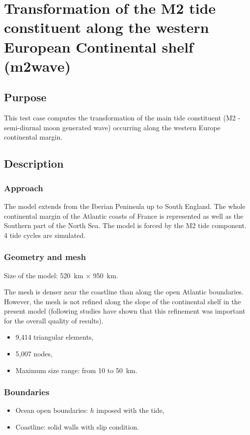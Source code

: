 \chapter{Transformation of the M2 tide constituent along the western European Continental shelf (m2wave)}

\section{Purpose}
This test case computes the transformation of the main tide constituent
(M2 - semi-diurnal moon generated wave) occurring along the western Europe continental margin.

\section{Description}
\subsection{Approach}
The model extends from the Iberian Peninsula up to South England. The
whole continental margin of the Atlantic coasts of France is represented
as well as the Southern part of the North Sea. The model is forced by
the M2 tide component. 4 tide cycles are simulated.

\subsection{Geometry and mesh}
Size of the model: 520~km $\times$ 950~km.

The mesh is denser near the coastline than along the open Atlantic boundaries.
However, the mesh is not refined along the slope of the continental shelf in
the present model (following studies have shown that this refinement was
important for the overall quality of results).

\begin{itemize}
\item 9,414 triangular elements,
\item 5,007 nodes,
\item Maximum size range: from 10 to 50~km.
\end{itemize}

\subsection{Boundaries}

\begin{itemize}
\item Ocean open boundaries: $h$ imposed with the tide,
\item Coastline: solid walls with slip condition.
\end{itemize}

